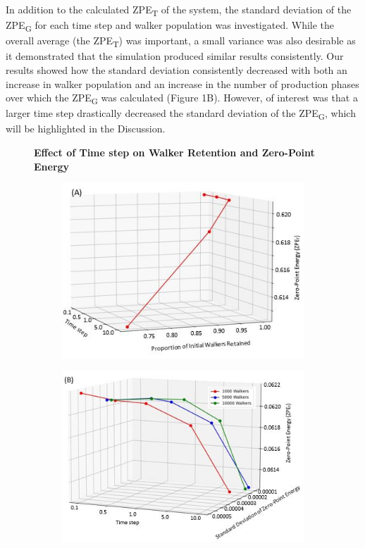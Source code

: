 \documentclass[journal=jacsat,manuscript=article]{achemso}
\newcommand*{\figuretitle}[1]{%
    {\centering%
    \textbf{#1}%
    \par\medskip}%
}
\begin{document}
In addition to the calculated ZPE\textsubscript{T} of the system, the standard deviation of the ZPE\textsubscript{G} for each time step and walker population was investigated. While the overall average (the ZPE\textsubscript{T}) was important, a small variance was also desirable as it demonstrated that the simulation produced similar results consistently. Our results showed how the standard deviation consistently decreased with both an increase in walker population and an increase in the number of production phases over which the ZPE\textsubscript{G} was calculated (Figure 1B). However, of interest was that a larger time step drastically decreased the standard deviation of the ZPE\textsubscript{G}, which will be highlighted in the Discussion. 

\begin{figure}[H]
\centering
\figuretitle{Effect of Time step on Walker Retention and Zero-Point Energy}
\begin{subfigure}{.5\textwidth}
  \centering
  \includegraphics[width=\linewidth]{figures/fig_2A.jpg}
\end{subfigure}%
\begin{subfigure}{.5\textwidth}
  \centering
  \includegraphics[width=\linewidth]{figures/fig_2B.jpg}

\end{subfigure}
\end{figure}
\end{document}
